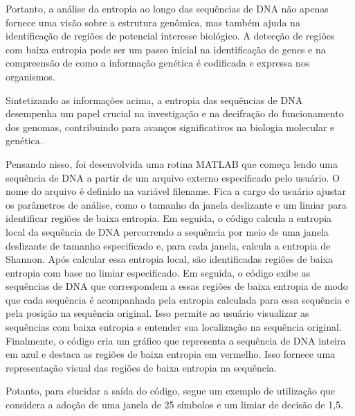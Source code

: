 \documentclass{article}
\begin{document}
Portanto, a análise da entropia ao longo das sequências de DNA não apenas fornece uma visão sobre a estrutura genômica, mas também ajuda na identificação de regiões de potencial interesse biológico. A detecção de regiões com baixa entropia pode ser um passo inicial na identificação de genes e na compreensão de como a informação genética é codificada e expressa nos organismos. 

Sintetizando as informações acima, a entropia das sequências de DNA desempenha um papel crucial na investigação e na decifração do funcionamento dos genomas, contribuindo para avanços significativos na biologia molecular e genética.

Pensando nisso, foi desenvolvida uma rotina MATLAB que começa lendo uma sequência de DNA a partir de um arquivo externo especificado pelo usuário. O nome do arquivo é definido na variável filename. Fica a cargo do usuário ajustar os parâmetros de análise, como o tamanho da janela deslizante e um limiar para identificar regiões de baixa entropia. Em seguida, o código calcula a entropia local da sequência de DNA percorrendo a sequência por meio de uma janela deslizante de tamanho especificado e, para cada janela, calcula a entropia de Shannon. Após calcular essa entropia local, são identificadas regiões de baixa entropia com base no limiar especificado. Em seguida, o código exibe as sequências de DNA que correspondem a essas regiões de baixa entropia de modo que cada sequência é acompanhada pela entropia calculada para essa sequência e pela posição na sequência original. Isso permite ao usuário visualizar as sequências com baixa entropia e entender sua localização na sequência original. Finalmente, o código cria um gráfico que representa a sequência de DNA inteira em azul e destaca as regiões de baixa entropia em vermelho. Isso fornece uma representação visual das regiões de baixa entropia na sequência.

Potanto, para elucidar a saída do código, segue um exemplo de utilização que considera a adoção de uma janela de 25 símbolos e um limiar de decisão de 1,5.
\end{document}

